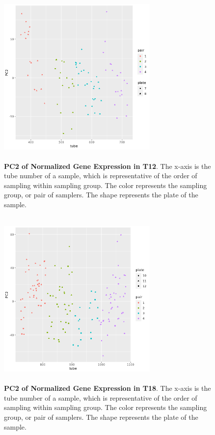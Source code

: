 \documentclass[article,9pt,twocolumn,twoside]{rilabRxiv}
\begin{document}
\begin{figure}[!ht]
\centering
\includegraphics[width=0.7\textwidth,height=3.5in]{figures/WD_0712_PC2_pair_tube.png}
\caption{\textbf{PC2 of Normalized Gene Expression in T12}. The x-axis is the tube number of a sample, which is representative of the order of sampling within sampling group. The color represents the sampling group, or pair of samplers. The shape represents the plate of the sample.}
\label{fig:chapter2_t12pc2}
\end{figure}

\begin{figure}[!ht]
\centering
\includegraphics[width=0.7\textwidth,height=3.5in]{figures/WD_0718_PC2_pair_tube.png}
\caption{\textbf{PC2 of Normalized Gene Expression in T18}. The x-axis is the tube number of a sample, which is representative of the order of sampling within sampling group. The color represents the sampling group, or pair of samplers. The shape represents the plate of the sample.}
\label{fig:chapter2_t18pc2}
\end{figure}
\end{document}

